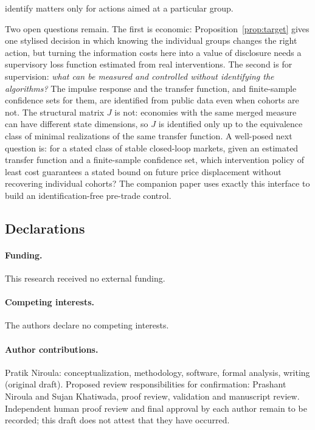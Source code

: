 \documentclass[12pt]{article}
\theoremstyle{definition}
\theoremstyle{remark}
\begin{document}
identify matters only for actions aimed at a particular group.

Two open questions remain. The first is economic: Proposition~\ref{prop:target} gives one stylised decision in which knowing the individual groups changes the right action, but turning the information costs here into a value of disclosure needs a supervisory loss function estimated from real interventions. The second is for supervision: \emph{what can be measured and controlled without identifying the algorithms?} The impulse response and the transfer function, and finite-sample confidence sets for them, are identified from public data even when cohorts are not. The structural matrix $J$ is not: economies with the same merged measure can have different state dimensions, so $J$ is identified only up to the equivalence class of minimal realizations of the same transfer function. A well-posed next question is: for a stated class of stable closed-loop markets, given an estimated transfer function and a finite-sample confidence set, which intervention policy of least cost guarantees a stated bound on future price displacement without recovering individual cohorts? The companion paper uses exactly this interface to build an identification-free pre-trade control.

\subsection*{Declarations}

\paragraph{Funding.} This research received no external funding.

\paragraph{Competing interests.} The authors declare no competing interests.

\paragraph{Author contributions.} Pratik Niroula: conceptualization, methodology, software, formal analysis, writing (original draft). Proposed review responsibilities for confirmation: Prashant Niroula and Sujan Khatiwada, proof review, validation and manuscript review. Independent human proof review and final approval by each author remain to be recorded; this draft does not attest that they have occurred.
\end{document}
